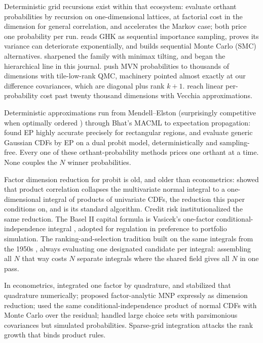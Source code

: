 \documentclass[12pt]{article}
\theoremstyle{remark}
\begin{document}
Deterministic grid recursions exist within that ecosystem: \citet{miwa2003}
evaluate orthant probabilities by recursion on one-dimensional lattices,
at factorial cost in the dimension for general correlation, and
\citet{craig2008} accelerates the Markov case; both price one
probability per run. \citet{ridgway2016} reads GHK as sequential importance sampling, proves its
variance can deteriorate exponentially, and builds sequential Monte
Carlo (SMC) alternatives. \citet{botev2017} sharpened the family with
minimax tilting, and \citet{genton2018} began the hierarchical line in
this journal. \citet{cao2021} push MVN probabilities to thousands of
dimensions with tile-low-rank QMC, machinery pointed almost exactly at
our difference covariances, which are diagonal plus rank $k+1$.
\citet{cao2025} reach linear per-probability cost past twenty thousand
dimensions with Vecchia approximations.

Deterministic approximations run from Mendell--Elston \citep{mendell1974}
(surprisingly competitive when optimally ordered \citep{connors2014})
through Bhat's MACML \citep{bhat2011} to expectation propagation:
\citet{cunningham2011} found EP
highly accurate precisely for rectangular regions, and \citet{fasano2025} evaluate generic Gaussian CDFs by EP on a dual probit
model, deterministically and sampling-free. Every one of these
orthant-probability methods prices one
orthant at a time. None couples the $N$ winner probabilities.

Factor dimension reduction for probit is old, and older than
econometrics: \citet{curnow1962} showed that product correlation
collapses the multivariate normal integral to a one-dimensional integral
of products of univariate CDFs, the reduction this paper conditions on,
and \citet{dunnett1989} is its standard algorithm. Credit risk
institutionalized the same reduction. The Basel II capital formula is
Vasicek's one-factor conditional-independence integral
\citep{vasicek2002,gordy2003}, adopted for regulation in preference to
portfolio simulation. The ranking-and-selection
tradition built on the same integrals from the 1950s
\citep{bechhofer1954,gupta1963}, always evaluating one designated
candidate per integral: assembling all $N$ that way costs $N$ separate
integrals where the shared field gives all $N$ in one pass.

In
econometrics, \citet{butler1982} integrated one factor by quadrature,
and \citet{lee2000} stabilized that quadrature numerically;
\citet{mcfadden1984} proposed factor-analytic MNP expressly as dimension
reduction; \citet{stern1992} used the same conditional-independence
product of normal CDFs with Monte Carlo over the residual;
\citet{bolduc1999} handled large choice sets with parsimonious
covariances but simulated probabilities. Sparse-grid integration
\citep{heiss2008} attacks the rank growth that binds product rules.
\end{document}
